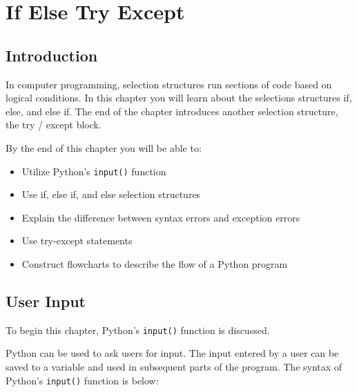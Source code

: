 \documentclass{book}
\newcommand{\passthrough}[1]{#1}
\begin{document}
    
        \hypertarget{if-else-try-except}{%
\chapter{If Else Try Except}\label{if-else-try-except}}
    




    
        \hypertarget{introduction}{%
\section{Introduction}\label{introduction}}
    




    
        In computer programming, selection structures run sections of code based
on logical conditions. In this chapter you will learn about the
selections structures if, else, and else if. The end of the chapter
introduces another selection structure, the try / except block.

By the end of this chapter you will be able to:

\begin{itemize}
\item
  Utilize Python's \passthrough{\lstinline!input()!} function
\item
  Use if, else if, and else selection structures
\item
  Explain the difference between syntax errors and exception errors
\item
  Use try-except statements
\item
  Construct flowcharts to describe the flow of a Python program
\end{itemize}
        \newpage

    




    
        \hypertarget{user-input}{%
\section{User Input}\label{user-input}}
    




    
        To begin this chapter, Python's \passthrough{\lstinline!input()!}
function is discussed.
    




    
        Python can be used to ask users for input. The input entered by a user
can be saved to a variable and used in subsequent parts of the program.
The syntax of Python's \passthrough{\lstinline!input()!} function is
below:
\end{document}

